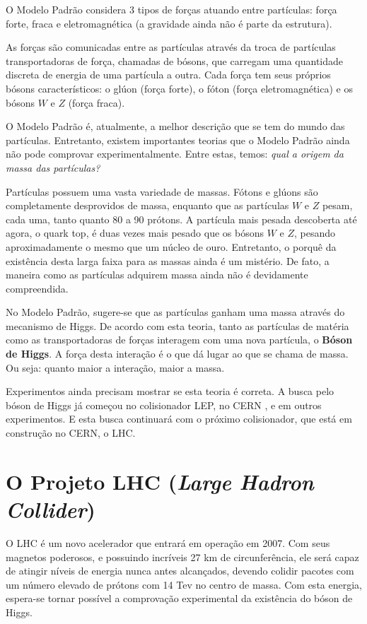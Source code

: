 O Modelo Padrão considera 3 tipos de forças atuando entre partículas: força forte, fraca e eletromagnética (a gravidade ainda não é parte da estrutura).

As forças são comunicadas entre as partículas através da troca de partículas transportadoras de força, chamadas de bósons, que carregam uma quantidade discreta de energia de uma partícula a outra. Cada força tem seus próprios bósons característicos: o glúon (força forte), o fóton (força eletromagnética) e os bósons
$W$ e $Z$ (força fraca).

O Modelo Padrão é, atualmente, a melhor descrição que se tem do mundo das partículas. Entretanto, existem importantes teorias que o Modelo Padrão ainda não pode comprovar experimentalmente. Entre estas, temos: \emph{qual a origem da massa das partículas?}

Partículas possuem uma vasta variedade de massas. Fótons e glúons são completamente desprovidos de massa, enquanto que as partículas $W$ e $Z$ pesam, cada uma, tanto quanto 80 a 90 prótons. A partícula mais pesada descoberta até agora, o quark top, é duas vezes mais pesado que os bósons $W$ e $Z$, pesando aproximadamente o mesmo
que um núcleo de ouro. Entretanto, o porquê da existência desta larga faixa para as massas ainda é um mistério. De fato, a maneira como as partículas adquirem massa ainda não é devidamente compreendida.

No Modelo Padrão, sugere-se que as partículas ganham uma massa através do mecanismo de Higgs. De acordo com esta teoria, tanto as partículas de matéria como as transportadoras de forças interagem com uma nova partícula, o \textbf{Bóson de Higgs}. A força desta interação é o que dá lugar ao que se chama de massa. Ou seja:
quanto maior a interação, maior a massa.

Experimentos ainda precisam mostrar se esta teoria é correta. A busca pelo bóson de Higgs já começou no colisionador LEP, no CERN \cite{bib:cern}, e em outros experimentos. E esta busca continuará com o próximo colisionador, que está em construção no CERN, o LHC.




\section{O Projeto LHC (\emph{Large Hadron Collider})}


O LHC \cite{bib:lhc} é um novo acelerador que entrará em operação em 2007. Com seus magnetos poderosos, e possuindo incríveis 27 km de circunferência, ele será capaz de atingir níveis de energia nunca antes alcançados, devendo colidir pacotes com um número elevado de prótons com 14 Tev no centro de massa. Com esta energia, espera-se tornar possível a comprovação experimental da existência do bóson de Higgs.


